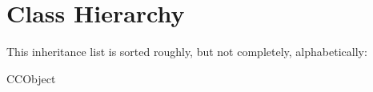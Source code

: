 \section{Class Hierarchy}
This inheritance list is sorted roughly, but not completely, alphabetically\-:\begin{DoxyCompactList}
\item C\-C\-Object\begin{DoxyCompactList}
\item {}
\item {}
\end{DoxyCompactList}
\item {}
\item {}
\end{DoxyCompactList}
